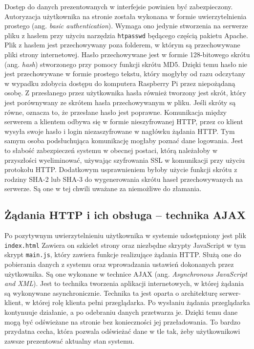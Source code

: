 \documentclass[a4paper,12pt,twoside]{article}
\begin{document}
Dostęp do danych prezentowanych w interfejsie powinien być zabezpieczony. Autoryzacja użytkownika na stronie została wykonana w formie uwierzytelnienia prostego (ang. \textit{basic authentication}). Wymaga ono jedynie stworzenia na serwerze pliku z hasłem przy użyciu narzędzia \texttt{htpasswd} będącego częścią pakietu Apache. Plik z hasłem jest przechowywany poza folderem, w którym są przechowywane pliki strony internetowej. Hasło przechowywane jest w formie 128-bitowego skrótu (ang. \textit{hash}) stworzonego przy pomocy funkcji skrótu MD5.\cite{apache-password} Dzięki temu hasło nie jest przechowywane w formie prostego tekstu, który mogłyby od razu odczytany w wypadku zdobycia dostępu do komputera Raspberry Pi przez niepożądaną osobę. Z przesłanego przez użytkownika hasła również tworzony jest skrót, który jest porównywany ze skrótem hasła przechowywanym w pliku. Jeśli skróty są równe, oznacza to, że przesłane hasło jest poprawne. Komunikacja między serwerem a klientem odbywa się w formie nieszyfrowanej HTTP, przez co klient wysyła swoje hasło i login niezaszyfrowane w nagłówku żądania HTTP.\cite{http-auth} Tym samym osoba podsłuchująca komunikację mogłaby poznać dane logowania. Jest to słabość zabezpieczeń systemu w obecnej postaci, którą należałoby w przyszłości wyeliminować, używając szyfrowania SSL w komunikacji przy użyciu protokołu HTTP. Dodatkowym usprawnieniem byłoby użycie funkcji skrótu z rodziny SHA-2 lub SHA-3 do wygenerowania skrótu haseł przechowywanych na serwerze. Są one w tej chwili uważane za niemożliwe do złamania.
 
\subsection{Żądania HTTP i ich obsługa -- technika AJAX}
Po pozytywnym uwierzytelnieniu użytkownika w systemie udostępniony jest plik \texttt{index.html} Zawiera on szkielet strony oraz niezbędne skrypty JavaScript w tym skrypt \texttt{main.js}, który zawiera funkcje realizujące żądania HTTP. Służą one do pobierania danych z systemu oraz wprowadzania ustawień dokonanych przez użytkownika. Są one wykonane w technice AJAX (ang. \textit{Asynchronous JavaScript and XML}). Jest to technika tworzenia aplikacji internetowych, w której żądania są wykonywane asynchronicznie. Technika ta jest oparta o architekturę serwer-klient, w której rolę klienta pełni przeglądarka. Po wysłaniu żądania przeglądarka kontynuuje działanie, a po odebraniu danych przetwarza je. Dzięki temu dane mogą być odświeżane na stronie bez konieczności jej przeładowania. To bardzo przydatna cecha, która pozwala odświeżać dane w tle tak, żeby użytkownikowi zawsze prezentować aktualny stan systemu.
\end{document}

